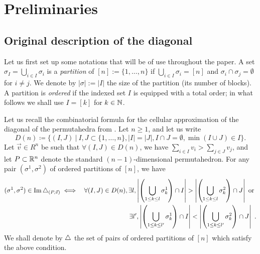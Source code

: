 
\section{Preliminaries}
\label{s:prelim}

\subsection{Original description of the diagonal}

Let us first set up some notations that will be of use throughout the paper. 
A set $\sigma_I = \bigcup_{i\in I} \sigma_i$ is a \emph{partition} of $[n]:=\{1,\ldots,n\}$ if $\bigcup_{i\in I} \sigma_i = [n]$ and $\sigma_i \cap \sigma_j = \emptyset$ for $i \neq j$.
We denote by $|\sigma|:=|I|$ the size of the partition (its number of blocks).
A partition is \emph{ordered} if the indexed set $I$ is equipped with a total order; in what follows we shall use $I=[k]$ for $k \in \mathbb N$. 

Let us recall the combinatorial formula for the cellular approximation of the diagonal of the permutahedra from \cite[Theorem 3.16]{LA21}.
Let $n\geq 1$, and let us write \[ D(n) \coloneqq \{(I,J) \ | \ I,J\subset\{1,\ldots,n\}, |I|=|J|, I\cap J=\emptyset, \min(I\cup J)\in I \}. \] 
Let $\vec v \in R^n$ be such that $\forall (I,J) \in D(n)$, we have $\sum_{i \in I} v_i > \sum_{j \in J} v_j$, and let $P\subset \mathbb R^n$ denote the standard $(n-1)$-dimensional permutahedron.
For any pair $(\sigma^1,\sigma^2)$ of ordered partitions of $[n]$, we have
\begin{eqnarray*}
    (\sigma^1,\sigma^2)\in \operatorname{Im}\triangle_{(P,\vec v)} 
    & \iff & \forall (I,J) \in D(n), \exists l , 
    \left| \left(\bigcup_{1\leq k \leq l} \sigma^1_{k} \right)\cap I \right|
    >
    \left| \left(\bigcup_{1\leq k \leq l} \sigma^2_{k} \right)\cap J \right| \text{ or } \\
    && \exists l' , 
    \left| \left(\bigcup_{1\leq k \leq l'} \sigma^1_{k} \right)\cap I \right|
    <
    \left| \left(\bigcup_{1\leq k \leq l'} \sigma^2_{k} \right)\cap J \right|  \ . 
\end{eqnarray*}
We shall denote by $\triangle$ the set of pairs of ordered partitions of $[n]$ which satisfy the above condition. 

